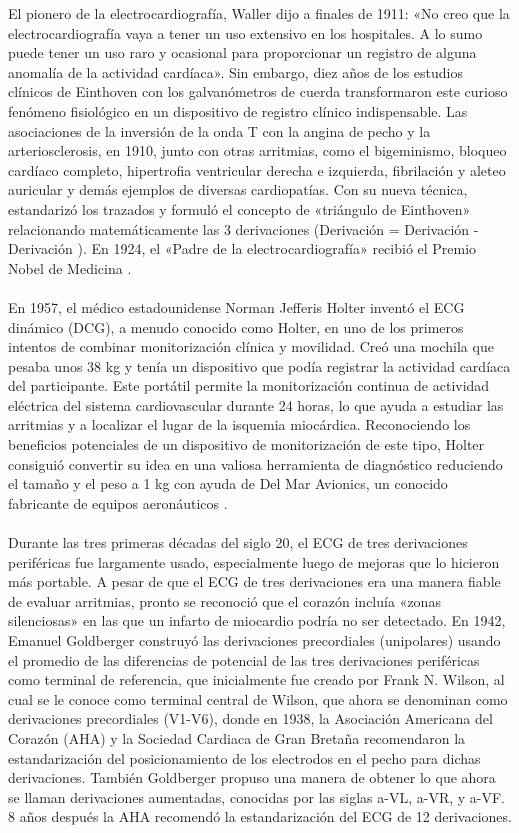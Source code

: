 \documentclass[12pt,letterpaper,oneside,openright]{book}
\begin{document}
    El pionero de la electrocardiografía, Waller dijo a finales de 1911: «No creo que la electrocardiografía vaya a tener un uso extensivo en los hospitales. A lo sumo puede tener un uso raro y ocasional para proporcionar un registro de alguna anomalía de la actividad cardíaca». Sin embargo, diez años de los estudios clínicos de Einthoven con los galvanómetros de cuerda transformaron este curioso fenómeno fisiológico en un dispositivo de registro clínico indispensable. Las asociaciones de la inversión de la onda T con la angina de pecho y la arteriosclerosis, en 1910, junto con otras arritmias, como el bigeminismo, bloqueo cardíaco completo, hipertrofia ventricular derecha e izquierda, fibrilación y aleteo auricular y demás ejemplos de diversas cardiopatías. Con su nueva técnica, estandarizó los trazados y formuló el concepto de «triángulo de Einthoven» relacionando matemáticamente las 3 derivaciones (Derivación  = Derivación  - Derivación ). En 1924, el «Padre de la electrocardiografía» recibió el Premio Nobel de Medicina \cite{vincent2022}.\\
    \\
    En 1957, el médico estadounidense Norman Jefferis Holter inventó el ECG dinámico (DCG), a menudo conocido como Holter, en uno de los primeros intentos de combinar monitorización clínica y movilidad. Creó una mochila que pesaba unos 38 kg y tenía un dispositivo que podía registrar la actividad cardíaca del participante. Este portátil permite la monitorización continua de actividad eléctrica del sistema cardiovascular durante 24 horas, lo que ayuda a estudiar las arritmias y a localizar el lugar de la isquemia miocárdica. Reconociendo los beneficios potenciales de un dispositivo de monitorización de este tipo, Holter consiguió convertir su idea en una valiosa herramienta de diagnóstico reduciendo el tamaño y el peso a 1 kg con ayuda de Del Mar Avionics, un conocido fabricante de equipos aeronáuticos \cite{vincent2022}.\\
    \\
    Durante las tres primeras décadas del siglo 20, el ECG de tres derivaciones periféricas fue largamente usado, especialmente luego de mejoras que lo hicieron más portable. A pesar de que el ECG de tres derivaciones era una manera fiable de evaluar arritmias, pronto se reconoció que el corazón incluía «zonas silenciosas» en las que un infarto de miocardio podría no ser detectado. En 1942, Emanuel Goldberger construyó las derivaciones precordiales (unipolares) usando el promedio de las diferencias de potencial de las tres derivaciones periféricas como terminal de referencia, que inicialmente fue creado por Frank N. Wilson, al cual se le conoce como terminal central de Wilson, que ahora se denominan como derivaciones precordiales (V1-V6), donde en 1938, la Asociación Americana del Corazón (AHA) y la Sociedad Cardiaca de Gran Bretaña recomendaron la estandarización del posicionamiento de los electrodos en el pecho para dichas derivaciones. También Goldberger propuso una manera de obtener lo que ahora se llaman derivaciones aumentadas, conocidas por las siglas a-VL, a-VR, y a-VF. 8 años después la AHA recomendó la estandarización del ECG de 12 derivaciones. \cite{vincent2022}\\
\end{document}
